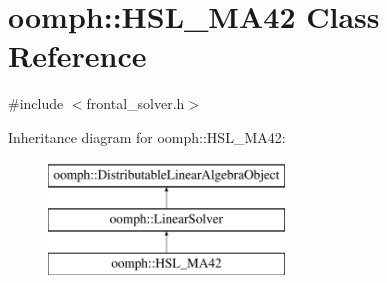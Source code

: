 \hypertarget{classoomph_1_1HSL__MA42}{}\section{oomph\+:\+:H\+S\+L\+\_\+\+M\+A42 Class Reference}
\label{classoomph_1_1HSL__MA42}


{\ttfamily \#include $<$frontal\+\_\+solver.\+h$>$}

Inheritance diagram for oomph\+:\+:H\+S\+L\+\_\+\+M\+A42\+:\begin{figure}[H]
\begin{center}
\leavevmode
\includegraphics[height=3.000000cm]{classoomph_1_1HSL__MA42}
\end{center}
\end{figure}
